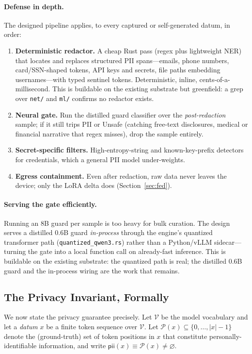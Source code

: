 \documentclass[11pt]{article}
\begin{document}
\paragraph{Defense in depth.}
The designed pipeline applies, to every captured or self-generated datum, in order:
\begin{enumerate}
    \item \textbf{Deterministic redactor.} A cheap Rust pass (regex plus lightweight NER) that locates and replaces structured PII spans---emails, phone numbers, card/SSN-shaped tokens, API keys and secrets, file paths embedding usernames---with typed sentinel tokens. Deterministic, inline, cents-of-a-millisecond. This is buildable on the existing substrate but greenfield: a grep over \texttt{net/} and \texttt{ml/} confirms no redactor exists.
    \item \textbf{Neural gate.} Run the distilled guard classifier over the \emph{post-redaction} sample; if it still trips PII or \textsf{Unsafe} (catching free-text disclosures, medical or financial narrative that regex misses), drop the sample entirely.
    \item \textbf{Secret-specific filters.} High-entropy-string and known-key-prefix detectors for credentials, which a general PII model under-weights.
    \item \textbf{Egress containment.} Even after redaction, raw data never leaves the device; only the LoRA delta does (Section~\ref{sec:fed}).
\end{enumerate}

\paragraph{Serving the gate efficiently.}
Running an 8B guard per sample is too heavy for bulk curation. The design serves a distilled $0.6$B guard \emph{in-process} through the engine's quantized transformer path (\texttt{quantized\_qwen3.rs}) rather than a Python/vLLM sidecar---turning the gate into a local function call on already-fast inference. This is buildable on the existing substrate: the quantized path is real; the distilled $0.6$B guard and the in-process wiring are the work that remains.

\subsection{The Privacy Invariant, Formally}
\label{sec:privinv}

We now state the privacy guarantee precisely. Let $\mathcal{V}$ be the model vocabulary and let a \emph{datum} $x$ be a finite token sequence over $\mathcal{V}$. Let $\mathcal{P}(x) \subseteq \{0,\dots,|x|-1\}$ denote the (ground-truth) set of token positions in $x$ that constitute personally-identifiable information, and write $\textsf{pii}(x) \equiv \mathcal{P}(x) \neq \varnothing$.
\end{document}
